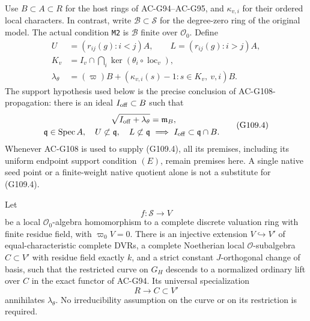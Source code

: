 Use \(B\subset A\subset R\) for the host rings of AC-G94--AC-G95,
and \(\kappa_{v,i}\) for their ordered local characters.  In contrast,
write \(\mathscr B\subset\mathscr S\) for the degree-zero ring of
the original model.  The actual condition \texttt{M2} is
\(\mathscr B\) finite over \(\mathcal O_0\).
Define
\[
 \begin{split}
 U&=(r_{ij}(g):i<j)A,\qquad L=(r_{ij}(g):i>j)A,\\
 K_v&=I_v\cap\bigcap_i\ker(\theta_i\circ\operatorname{loc}_v),\\
 \lambda_\theta&=(\varpi)B+
    (\kappa_{v,i}(s)-1:s\in K_v,\ v,i)B.
 \end{split}
 \tag{G109.3}
\]
The support hypothesis used below is the precise conclusion of
AC-G108-propagation: there is an ideal \(I_{\rm off}\subset B\)
such that
\[
 \begin{split}
 \sqrt{I_{\rm off}+\lambda_\theta}&=\mathfrak m_B,\\
 \mathfrak q\in\operatorname{Spec}A,\quad
 U\not\subset\mathfrak q,\quad L\not\subset\mathfrak q
       &\ \Longrightarrow\ I_{\rm off}\subset\mathfrak q\cap B.
 \end{split}
 \tag{G109.4}
\]
Whenever AC-G108 is used to supply (G109.4), all its premises,
including its uniform endpoint support condition \((E)\), remain
premises here.  A single native seed point or a finite-weight
native quotient alone is not a substitute for (G109.4).

\begin{proposition}
\label{AC-G109-curve}
Let
\[
 f:\mathscr S\longrightarrow V
 \tag{G109.5}
\]
be a local \(\mathcal O_0\)-algebra homomorphism to a complete
discrete valuation ring with finite residue field, with
\(\varpi_0 V=0\).  There is an injective extension
\(V\hookrightarrow V'\) of equal-characteristic complete DVRs,
a complete Noetherian local \(\mathcal O\)-subalgebra
\(C\subset V'\) with residue field exactly \(k\), and a
strict constant \(J\)-orthogonal change of basis, such that
the restricted curve on \(G_H\) descends to a
normalized ordinary lift over \(C\) in the exact functor of
AC-G94.  Its universal specialization
\[
             R\longrightarrow C\subset V'
 \tag{G109.6}
\]
annihilates \(\lambda_\theta\).  No irreducibility assumption on
the curve or on its restriction is required.
\end{proposition}

